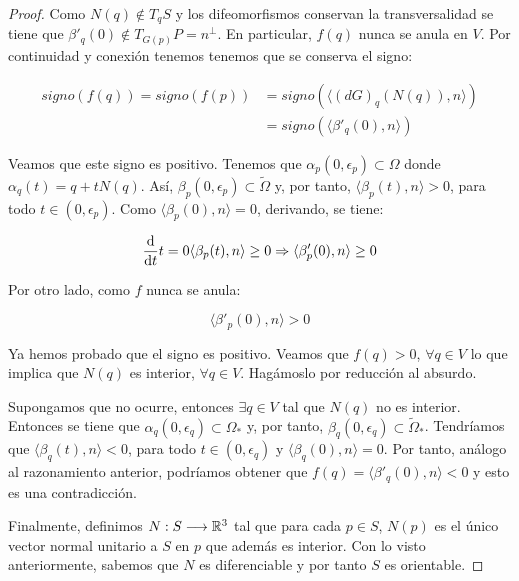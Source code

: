 \begin{proof}
Como $N(q) \not\in T_qS$ y los difeomorfismos conservan la transversalidad se tiene que $\beta'_q(0) \not\in T_{G(p)}P = n^\perp$. En particular, $f(q)$ nunca se anula en $V$. Por continuidad y conexión tenemos tenemos que se conserva el signo:

\begin{align*}
    signo(f(q)) = signo(f(p)) &= signo(\langle (dG)_q(N(q)), n \rangle) \\  &= signo(\langle \beta'_q(0), n \rangle)
\end{align*}

Veamos que este signo es positivo. Tenemos que $\alpha_p(0, \epsilon_p) \subset \Omega$ donde $\alpha_q(t) = q + tN(q)$. Así, $\beta_p(0, \epsilon_p) \subset \tilde{\Omega}$ y, por tanto, $\langle \beta_p(t), n \rangle > 0$, para todo $t \in (0, \epsilon_p)$. Como $\langle \beta_p(0), n \rangle = 0$, derivando, se tiene:

\begin{equation*}
    \diff{}{t}{t=0} \langle \beta_p(t), n \rangle \geq 0 \Rightarrow \langle \beta'_p(0), n \rangle \geq 0
\end{equation*}

Por otro lado, como $f$ nunca se anula:

\begin{equation*}
    \langle \beta'_p(0), n \rangle > 0
\end{equation*}

Ya hemos probado que el signo es positivo. Veamos que $f(q) > 0$, $\forall q \in V$ lo que implica que $N(q)$ es interior, $\forall q \in V$. Hagámoslo por reducción al absurdo. 

Supongamos que no ocurre, entonces $\exists q \in V$ tal que $N(q)$ no es interior. Entonces se tiene que $\alpha_q(0, \epsilon_q) \subset \Omega_*$ y, por tanto, $\beta_q(0, \epsilon_q) \subset \tilde{\Omega}_*$. Tendríamos que $\langle \beta_q(t), n \rangle < 0$, para todo $t \in (0, \epsilon_q)$ y $\langle \beta_q(0), n \rangle = 0$. Por tanto, análogo al razonamiento anterior, podríamos obtener que $f(q) = \langle \beta'_q(0), n \rangle < 0$ y esto es una contradicción.

Finalmente, definimos $N: S \longrightarrow \mathbb{R}^3$ tal que para cada $p\in S$, $N(p)$ es el único vector normal unitario a $S$ en $p$ que además es interior. Con lo visto anteriormente, sabemos que $N$ es diferenciable y por tanto $S$ es orientable.

\end{proof}

